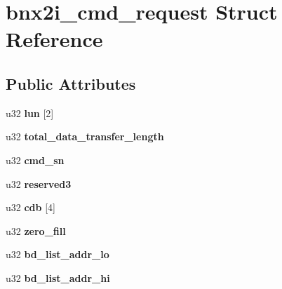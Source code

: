 \hypertarget{structbnx2i__cmd__request}{
\section{bnx2i\_\-cmd\_\-request Struct Reference}
\label{structbnx2i__cmd__request}
}
\subsection*{Public Attributes}
\begin{DoxyCompactItemize}
\item 
\hypertarget{structbnx2i__cmd__request_adbeb921bf77424fc5b8588b87670288f}{
u32 {\bfseries lun} \mbox{[}2\mbox{]}}
\label{structbnx2i__cmd__request_adbeb921bf77424fc5b8588b87670288f}

\item 
\hypertarget{structbnx2i__cmd__request_a8d0b2c8a739fb0ea1dff2351dccf68b6}{
u32 {\bfseries total\_\-data\_\-transfer\_\-length}}
\label{structbnx2i__cmd__request_a8d0b2c8a739fb0ea1dff2351dccf68b6}

\item 
\hypertarget{structbnx2i__cmd__request_aebb9ef253259100e9f07ff9e7cc0a885}{
u32 {\bfseries cmd\_\-sn}}
\label{structbnx2i__cmd__request_aebb9ef253259100e9f07ff9e7cc0a885}

\item 
\hypertarget{structbnx2i__cmd__request_a6d584cf4fa6da550413967c106b95591}{
u32 {\bfseries reserved3}}
\label{structbnx2i__cmd__request_a6d584cf4fa6da550413967c106b95591}

\item 
\hypertarget{structbnx2i__cmd__request_ab2b948c3f13da41b892f0ecfd8a91ed0}{
u32 {\bfseries cdb} \mbox{[}4\mbox{]}}
\label{structbnx2i__cmd__request_ab2b948c3f13da41b892f0ecfd8a91ed0}

\item 
\hypertarget{structbnx2i__cmd__request_af2f424697b6c568ca98de555de1c3f5f}{
u32 {\bfseries zero\_\-fill}}
\label{structbnx2i__cmd__request_af2f424697b6c568ca98de555de1c3f5f}

\item 
\hypertarget{structbnx2i__cmd__request_a767c14d27bdbf3a39a74cfd59251bdb6}{
u32 {\bfseries bd\_\-list\_\-addr\_\-lo}}
\label{structbnx2i__cmd__request_a767c14d27bdbf3a39a74cfd59251bdb6}

\item 
\hypertarget{structbnx2i__cmd__request_ab5114d348c04f4818e4dc00613d7c263}{
u32 {\bfseries bd\_\-list\_\-addr\_\-hi}}
\label{structbnx2i__cmd__request_ab5114d348c04f4818e4dc00613d7c263}

\end{DoxyCompactItemize}


